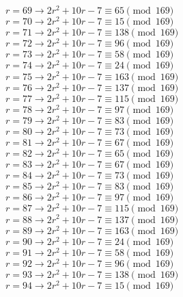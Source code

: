 \documentclass[12pt]{article}
\begin{document}
\begin{itemize}
\begin{multicols}{2}
$r = 69 \rightarrow 2r^2 + 10r - 7 \equiv 65 \pmod{169}$ \\
$r = 70 \rightarrow 2r^2 + 10r - 7 \equiv 15 \pmod{169}$ \\
$r = 71 \rightarrow 2r^2 + 10r - 7 \equiv 138 \pmod{169}$ \\
$r = 72 \rightarrow 2r^2 + 10r - 7 \equiv 96 \pmod{169}$ \\
$r = 73 \rightarrow 2r^2 + 10r - 7 \equiv 58 \pmod{169}$ \\
$r = 74 \rightarrow 2r^2 + 10r - 7 \equiv 24 \pmod{169}$ \\
$r = 75 \rightarrow 2r^2 + 10r - 7 \equiv 163 \pmod{169}$ \\
$r = 76 \rightarrow 2r^2 + 10r - 7 \equiv 137 \pmod{169}$ \\
$r = 77 \rightarrow 2r^2 + 10r - 7 \equiv 115 \pmod{169}$ \\
$r = 78 \rightarrow 2r^2 + 10r - 7 \equiv 97 \pmod{169}$ \\
$r = 79 \rightarrow 2r^2 + 10r - 7 \equiv 83 \pmod{169}$ \\
$r = 80 \rightarrow 2r^2 + 10r - 7 \equiv 73 \pmod{169}$ \\
$r = 81 \rightarrow 2r^2 + 10r - 7 \equiv 67 \pmod{169}$ \\
$r = 82 \rightarrow 2r^2 + 10r - 7 \equiv 65 \pmod{169}$ \\
$r = 83 \rightarrow 2r^2 + 10r - 7 \equiv 67 \pmod{169}$ \\
$r = 84 \rightarrow 2r^2 + 10r - 7 \equiv 73 \pmod{169}$ \\
$r = 85 \rightarrow 2r^2 + 10r - 7 \equiv 83 \pmod{169}$ \\
$r = 86 \rightarrow 2r^2 + 10r - 7 \equiv 97 \pmod{169}$ \\
$r = 87 \rightarrow 2r^2 + 10r - 7 \equiv 115 \pmod{169}$ \\
$r = 88 \rightarrow 2r^2 + 10r - 7 \equiv 137 \pmod{169}$ \\
$r = 89 \rightarrow 2r^2 + 10r - 7 \equiv 163 \pmod{169}$ \\
$r = 90 \rightarrow 2r^2 + 10r - 7 \equiv 24 \pmod{169}$ \\
$r = 91 \rightarrow 2r^2 + 10r - 7 \equiv 58 \pmod{169}$ \\
$r = 92 \rightarrow 2r^2 + 10r - 7 \equiv 96 \pmod{169}$ \\
$r = 93 \rightarrow 2r^2 + 10r - 7 \equiv 138 \pmod{169}$ \\
$r = 94 \rightarrow 2r^2 + 10r - 7 \equiv 15 \pmod{169}$ \\

\end{multicols}
\end{itemize}
\end{document}
